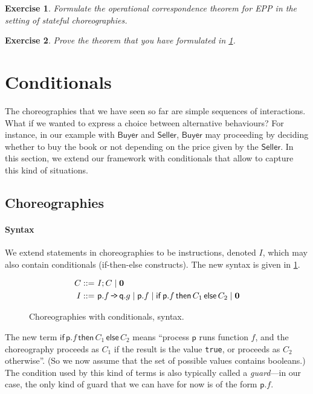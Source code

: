 \documentclass[a4paper,12pt]{article}
\newtheorem{exercise}{Exercise}
\newcommand*{\m}[1]{\ensuremath{\mathsf{#1}}}
\newcommand*{\pid}[1]{\m{#1}}
\newcommand*{\com}[2]{\ensuremath{#1 \, \mbox{\tt{-\!>}}\, #2}}
\newcommand*{\nil}{\ensuremath{\boldsymbol{0}}\xspace}
\newcommand*{\cond}[3]{\m{if}\, #1 \, \m{then} \, #2 \, \m{else} \, #3}
\newcommand*{\valuefnt}[1]{{\color{literal}\texttt{#1}}}
\newcommand*{\trueval}{\valuefnt{true}\xspace}
\begin{document}
\begin{exercise}
\label{ex:epp_thm_stateful}
Formulate the operational correspondence theorem for EPP in the setting of stateful 
choreographies.
\end{exercise}

\begin{exercise}
Prove the theorem that you have formulated in \cref{ex:epp_thm_stateful}.
\end{exercise}

\section{Conditionals}

The choreographies that we have seen so far are simple sequences of interactions.
What if we wanted to express a choice between alternative behaviours? For instance, in our 
example with \pid{Buyer} and \pid{Seller}, \pid{Buyer} may proceeding by deciding whether to buy 
the book or not depending on the price given by the \pid{Seller}.
In this section, we extend our framework with conditionals that allow to capture this kind of 
situations.

\subsection{Choreographies}

\paragraph{Syntax}
We extend statements in choreographies to be instructions, denoted $I$, which may also contain 
conditionals (if-then-else constructs). The new syntax is given in \cref{fig:c3_syntax}.

\begin{figure}
\begin{align*}
C ::=\ & I; C \mid \nil
\\
I ::=\ & \com{\pid p.f}{\pid q.g} \mid \pid p.f \mid \cond{\pid p.f}{C_1}{C_2} \mid \nil
\end{align*}
\caption{Choreographies with conditionals, syntax.}
\label{fig:c3_syntax}
\end{figure}

The new term $\cond{\pid p.f}{C_1}{C_2}$ means ``process \pid p runs function $f$, and the 
choreography proceeds as $C_1$ if the result is the value \trueval, or proceeds as $C_2$ 
otherwise''. (So we now assume that the set of possible values contains booleans.) The condition 
used by this kind of terms is also typically called a \emph{guard}---in our case, the only kind of 
guard that we can have for now is of the form $\pid p.f$.
\end{document}
